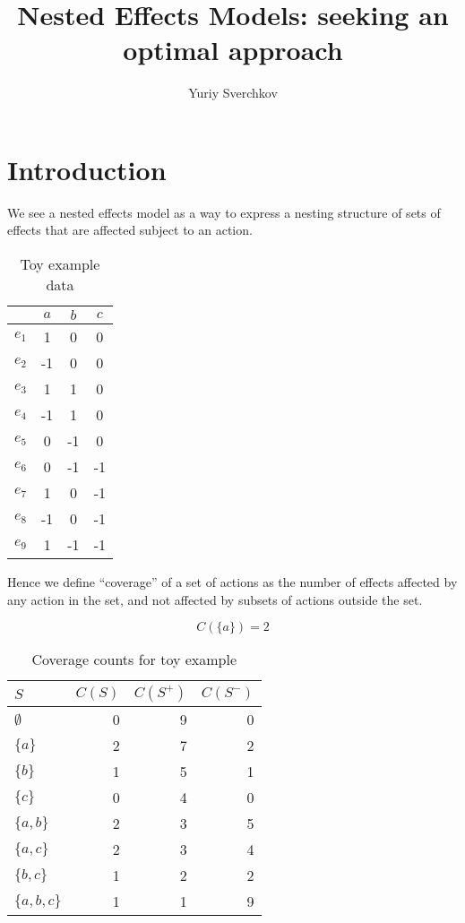 \documentclass[twocolumn]{article}
\title{Nested Effects Models: seeking an optimal approach}
\author{Yuriy Sverchkov}
\begin{document}
\maketitle

\section{Introduction}
We see a nested effects model as a way to express a nesting structure of sets of effects that are affected subject to an action.

\begin{table}
	\centering
	\begin{tabular}{l|ccc}
		      & $a$ & $b$ & $c$ \\ \hline
		$e_1$ &   1 &   0 &   0 \\
		$e_2$ &  -1 &   0 &   0 \\
		$e_3$ &   1 &   1 &   0 \\
		$e_4$ &  -1 &   1 &   0 \\
		$e_5$ &   0 &  -1 &   0 \\
		$e_6$ &   0 &  -1 &  -1 \\
		$e_7$ &   1 &   0 &  -1 \\
		$e_8$ &  -1 &   0 &  -1 \\
		$e_9$ &   1 &  -1 &  -1 \\
	\end{tabular}
	\caption{Toy example data}
\end{table}

Hence we define ``coverage'' of a set of actions as the number of effects affected by any action in the set, and not affected by subsets of actions outside the set.

\[
C( \{ a \} ) = 2
\]

\begin{table}
	\centering
	\begin{tabular}{l|rrr}
		$S$ & $C(S)$ & $C(S^+)$ & $C( S^- )$ \\ \hline
		$\emptyset$ & 0 & 9 & 0 \\
		$\{a\}$ & 2 & 7 & 2 \\
		$\{b\}$ & 1 & 5 & 1 \\
		$\{c\}$ & 0 & 4 & 0 \\
		$\{a,b\}$ & 2 & 3 & 5 \\
		$\{a,c\}$ & 2 & 3 & 4 \\
		$\{b,c\}$ & 1 & 2 & 2 \\
		$\{a,b,c\}$ & 1 & 1 & 9 \\
	\end{tabular}
	\caption{Coverage counts for toy example}
\end{table}
\end{document}
